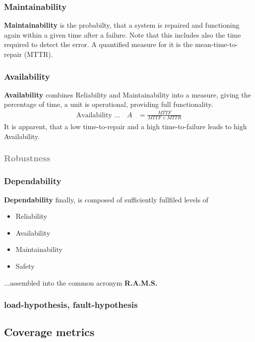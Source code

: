 \documentclass[master,english,smartquotes,apa]{hgbthesis}
\newcommand{\GREY}[1]{\textcolor{gray}{#1}}
\begin{document}
	\subsubsection{Maintainability}
	{\bf Maintainability} is the probabilty, that a system is repaired and functioning again within a given time after a failure. Note that this includes also the time required to detect the error.
	A quantified measure for it is the mean-time-to-repair (MTTR).
	\subsubsection{Availability}
	{\bf Availability} combines Reliability and Maintainability into a measure, giving the percentage of time, a unit is operational, providing full functionality.
		\begin{align*}
	\textrm{Availability ...} \quad A & = \frac{MTTF}{MTTF + MTTR}
		\end{align*}
	It is apparent, that a low time-to-repair and a high time-to-failure leads to high Availability.
	\subsubsection{\GREY{Robustness}}
	\subsubsection{Dependability}
	{\bf Dependability} finally, is composed of sufficiently fullfiled levels of \\
		\begin{itemize}
			\item Reliability
			\item Availability
			\item Maintainability
			\item Safety
		\end{itemize}
	...assembled into the common acronym {\bf R.A.M.S.}
	
	\subsubsection{load-hypothesis, fault-hypothesis}
	
	\subsection{Coverage metrics}
	
\end{document}
